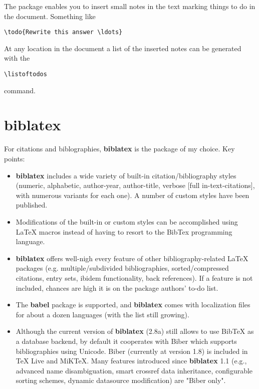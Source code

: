 The package enables you to insert small notes in the text marking things to do in the document. Something like

\begin{lstlisting}[language={[LaTeX]TeX}]
\todo{Rewrite this answer \ldots}
\end{lstlisting}

At any location in the document a list of the inserted notes can be generated with the 

\begin{lstlisting}[language={[LaTeX]TeX}]
\listoftodos
\end{lstlisting}

command.

\section{biblatex}
For citations and biblographies, \textbf{biblatex} is the package of my choice. Key points:

\begin{itemize}
	\item \textbf{biblatex} includes a wide variety of built-in citation/bibliography styles (numeric, alphabetic, author-year, author-title, verbose [full in-text-citations], with numerous variants for each one). A number of custom styles have been published.
	\item Modifications of the built-in or custom styles can be accomplished using \LaTeX{} macros instead of having to resort to the BibTex programming language.
	\item \textbf{biblatex} offers well-nigh every feature of other bibliography-related \LaTeX{} packages (e.g. multiple/subdivided bibliographies, sorted/compressed citations, entry sets, ibidem functionality, back references). If a feature is not included, chances are high it is on the package authors' to-do list.
	
	\item The \textbf{babel} package is supported, and \textbf{biblatex} comes with localization files for about a dozen languages (with the list still growing).
	
	\item Although the current version of \textbf{biblatex} (2.8a) still allows to use BibTeX as a database backend, by default it cooperates with Biber which supports bibliographies using Unicode. Biber (currently at version 1.8) is included in TeX Live and MiKTeX. Many features introduced since \textbf{biblatex} 1.1 (e.g., advanced name disambiguation, smart crossref data inheritance, configurable sorting schemes, dynamic datasource modification) are "Biber only".
\end{itemize}

